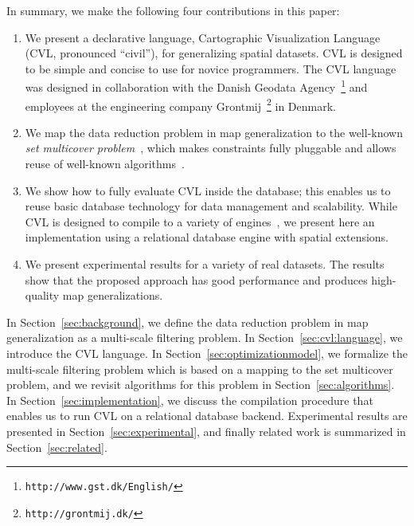 In summary, we make the following four contributions in this paper:
\begin{enumerate}
\item We present a declarative language, Cartographic Visualization Language (CVL, pronounced ``civil''), for generalizing spatial datasets. CVL is designed to be simple and concise to use for novice programmers. The CVL language was designed in collaboration with the Danish Geodata Agency~\footnote{\texttt{http://www.gst.dk/English/}} and employees at the engineering company Grontmij~\footnote{\texttt{http://grontmij.dk/}} in Denmark.

\item We map the data reduction problem in map generalization to the well-known \emph{set multicover problem}~\cite{rajagopalan1998primal}, which makes constraints fully pluggable and allows reuse of well-known algorithms~\cite{rajagopalan1998primal,vazirani2001approximation}.

\item We show how to fully evaluate CVL inside the database; this enables us to reuse basic database technology for data management and scalability. While CVL is designed to compile to a variety of engines~\cite{Stonebraker:2010:PDBMSvsMapReduce}, we present here an implementation using a relational database engine with spatial extensions.

\item We present experimental results for a variety of real datasets. The results show that the proposed approach has good performance and produces high-quality map generalizations.
\end{enumerate}

In Section~\ref{sec:background}, we define the data reduction problem in map generalization as a multi-scale filtering problem. In Section~\ref{sec:cvl:language}, we introduce the CVL language. In Section~\ref{sec:optimizationmodel}, we formalize the multi-scale filtering problem which is based on a mapping to the set multicover problem, and we revisit algorithms for this problem in Section~\ref{sec:algorithms}. In Section~\ref{sec:implementation}, we discuss the compilation procedure that enables us to run CVL on a relational database backend. Experimental results are presented in Section~\ref{sec:experimental}, and finally related work is summarized in Section~\ref{sec:related}.
